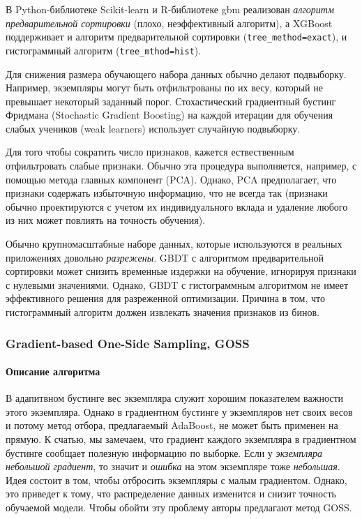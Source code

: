 \documentclass[%
	11pt,
	a4paper,
	utf8,
		]{article}
\begin{document}
В Python-библиотеке Scikit-learn и R-библиотеке gbm реализован \emph{алгоритм предварительной сортировки} (плохо, неэффективный алгоритм), а XGBoost поддерживает и алгоритм предварительной сортировки (\verb|tree_method=exact|), и гистограммный алгоритм (\verb|tree_mthod=hist|). 

Для снижения размера обучающего набора данных обычно делают подвыборку. Например, экземпляры могут быть отфильтрованы по их весу, который не превышает некоторый заданный порог. Стохастический градиентный бустинг Фридмана (Stochastic Gradient Boosting) на каждой итерации для обучения слабых учеников (weak learners) использует случайную подвыборку.

Для того чтобы сократить число признаков, кажется ествественным отфильтровать слабые признаки. Обычно эта процедура выполняется, например, с помощью метода главных компонент (PCA). Однако, PCA предполагает, что признаки содержать избыточную информацию, что не всегда так (признаки обычно проектируются с учетом их индивидуального вклада и удаление любого из них может повлиять на точность обучения).

Обычно крупномасштабные наборе данных, которые используются в реальных приложениях довольно \emph{разрежены}. GBDT с алгоритмом предварительной сортировки может снизить временные издержки на обучение, игнорируя признаки с нулевыми значениями. Однако, GBDT с гистограммным алгоритмом не имеет эффективного решения для разреженной оптимизации. Причина в том, что гистограммный алгоритм должен извлекать значения признаков из бинов.

\subsubsection{Gradient-based One-Side Sampling, GOSS}

\paragraph{Описание алгоритма} В адапитвном бустинге вес экземпляра служит хорошим показателем важности этого экземпляра. Однако в градиентном бустинге у экземпляров нет своих весов и потому метод отбора, предлагаемый AdaBoost, не может быть применен на прямую. К счатью, мы замечаем, что градиент каждого экземпляра в градиентном бустинге сообщает полезную информацию по выборке. Если у \emph{экземпляра небольшой градиент}, то значит и \emph{ошибка} на этом экземпляре тоже \emph{небольшая}. Идея состоит в том, чтобы отбросить экземпляры с малым градиентом. Однако, это приведет к тому, что распределение данных изменится и снизит точность обучаемой модели. Чтобы обойти эту проблему авторы предлагают метод GOSS.
\end{document}
